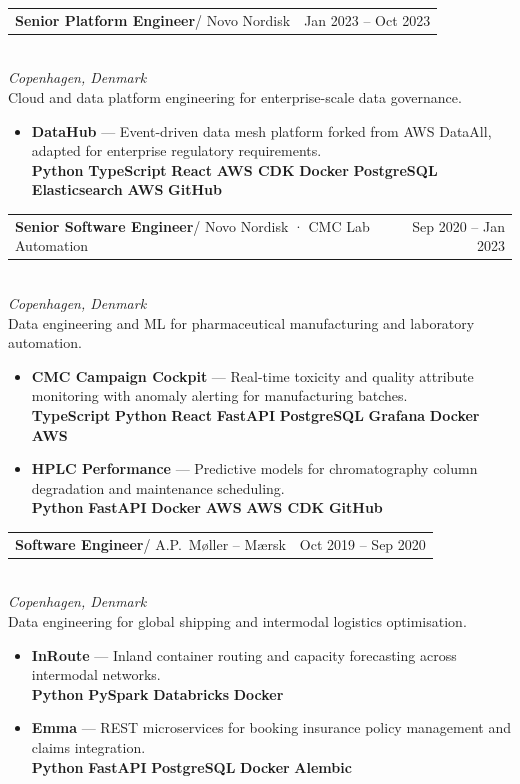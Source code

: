 \documentclass[10pt,a4paper]{article}
\makeatletter
\newcommand{\tech}[1]{%
  {\setlength{\fboxsep}{2.2pt}%
   \colorbox{tagbg}{\textcolor{brand}{\fontsize{6.5}{8}\selectfont\bfseries\sffamily #1}}}%
  \hspace{1pt}%
}
\newcommand{\datebadge}[1]{%
  {\setlength{\fboxsep}{2.5pt}%
   \colorbox{tagbg}{\textcolor{light}{\fontsize{7.5}{9}\selectfont\sffamily #1}}}%
}
\newcommand{\cventry}[4]{%
  \noindent
  \begin{tabularx}{\linewidth}{@{}X r@{}}
    \textcolor{brand}{\textbf{#1}}\enspace\textcolor{light}{\small#2} &
    \datebadge{#3}
  \end{tabularx}\\[-2pt]
  {\small\itshape\color{light} #4}\\[3pt]
}
\makeatother
\begin{document}
\cventry{Senior Platform Engineer}{/ Novo Nordisk}{Jan 2023 – Oct 2023}{Copenhagen, Denmark}
Cloud and data platform engineering for enterprise-scale data governance.
\begin{itemize}
  \item \textbf{DataHub} — Event-driven data mesh platform forked from AWS DataAll,
        adapted for enterprise regulatory requirements.\\[3pt]
        \tech{Python}\tech{TypeScript}\tech{React}\tech{AWS CDK}\tech{Docker}%
        \tech{PostgreSQL}\tech{Elasticsearch}\tech{AWS}\tech{GitHub}
\end{itemize}

\vspace{5pt}

\cventry{Senior Software Engineer}{/ Novo Nordisk · CMC Lab Automation}{Sep 2020 – Jan 2023}{Copenhagen, Denmark}
Data engineering and ML for pharmaceutical manufacturing and laboratory automation.
\begin{itemize}
  \item \textbf{CMC Campaign Cockpit} — Real-time toxicity and quality attribute monitoring
        with anomaly alerting for manufacturing batches.\\[3pt]
        \tech{TypeScript}\tech{Python}\tech{React}\tech{FastAPI}\tech{PostgreSQL}%
        \tech{Grafana}\tech{Docker}\tech{AWS}
  \item \textbf{HPLC Performance} — Predictive models for chromatography column degradation
        and maintenance scheduling.\\[3pt]
        \tech{Python}\tech{FastAPI}\tech{Docker}\tech{AWS}\tech{AWS CDK}\tech{GitHub}
\end{itemize}

\vspace{5pt}

\cventry{Software Engineer}{/ A.P.\ M{\o}ller -- M{\ae}rsk}{Oct 2019 – Sep 2020}{Copenhagen, Denmark}
Data engineering for global shipping and intermodal logistics optimisation.
\begin{itemize}
  \item \textbf{InRoute} — Inland container routing and capacity forecasting across
        intermodal networks.\\[3pt]
        \tech{Python}\tech{PySpark}\tech{Databricks}\tech{Docker}
  \item \textbf{Emma} — REST microservices for booking insurance policy management
        and claims integration.\\[3pt]
        \tech{Python}\tech{FastAPI}\tech{PostgreSQL}\tech{Docker}\tech{Alembic}
\end{itemize}
\end{document}
